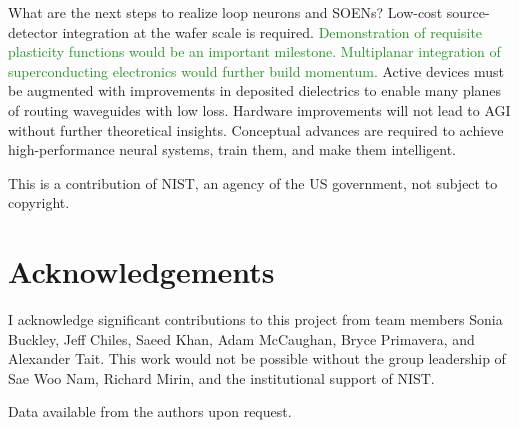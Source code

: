 \documentclass[twocolumn]{article}
\begin{document}
What are the next steps to realize loop neurons and SOENs? Low-cost source-detector integration at the wafer scale is required. \textcolor{ForestGreen}{Demonstration of requisite plasticity functions would be an important milestone. Multiplanar integration of superconducting electronics would further build momentum.} Active devices must be augmented with improvements in deposited dielectrics to enable many planes of routing waveguides with low loss. Hardware improvements will not lead to AGI without further theoretical insights. Conceptual advances are required to achieve high-performance neural systems, train them, and make them intelligent.

\vspace{2em}
\noindent This is a contribution of NIST, an agency of the US government, not subject to copyright.

\section{\label{sec:acknowledgements}Acknowledgements}
I acknowledge significant contributions to this project from team members Sonia Buckley, Jeff Chiles, Saeed Khan, Adam McCaughan, Bryce Primavera, and Alexander Tait. This work would not be possible without the group leadership of Sae Woo Nam, Richard Mirin, and the institutional support of NIST.

\vspace{2em}
\noindent Data available from the authors upon request.



\end{document}
